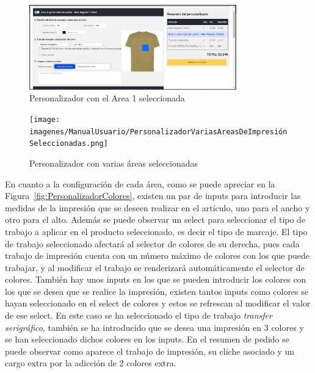 \documentclass[12pt]{article}
\begin{document}
\begin{figure}[ht]
    \centering
    \includegraphics[width=0.8\textwidth]{imagenes/ManualUsuario/PersonalizadorArea1Seleccionada.png}
    \caption{\label{fig:PersonalizadorAreaMarcada}Personalizador con el Area 1 seleccionada}
    \vspace{\fill}
\end{figure}

\begin{figure}[ht]
    \centering
    \texttt{[image: imagenes/ManualUsuario/PersonalizadorVariasAreasDeImpresiónSeleccionadas.png]}
    \caption{\label{fig:PersonalizadorVariasAreas}Personalizador con varias áreas seleccionadas}
    \vspace{\fill}
\end{figure}

En cuanto a la configuración de cada área, como se puede apreciar en la Figura~\ref{fig:PersonalizadorColores}, existen un par de inputs para introducir las medidas de la impresión que se deseen 
realizar en el artículo, uno para el ancho y otro para el alto. Además se puede observar un select para seleccionar el tipo de trabajo a aplicar en el producto seleccionado, es decir el tipo de marcaje. El tipo de trabajo seleccionado
afectará al selector de colores de su derecha, pues cada trabajo de impresión cuenta con un número máximo de colores con los que puede trabajar, y al modificar el trabajo se renderizará automáticamente el selector de colores.
También hay unos inputs en los que se pueden introducir los colores con los que se desea que se realice la impresión, existen tantos inputs como colores se hayan seleccionado en el select de colores y estos
se refrescan al modificar el valor de ese select. En este caso se ha seleccionado el tipo de trabajo \textit{transfer serigráfico}, también se ha introducido que se desea una impresión en 3 colores y se han seleccionado dichos colores en los inputs.
En el resumen de pedido se puede observar como aparece el trabajo de impresión, su cliche asociado y un cargo extra por la adicción de 2 colores extra.
\end{document}
